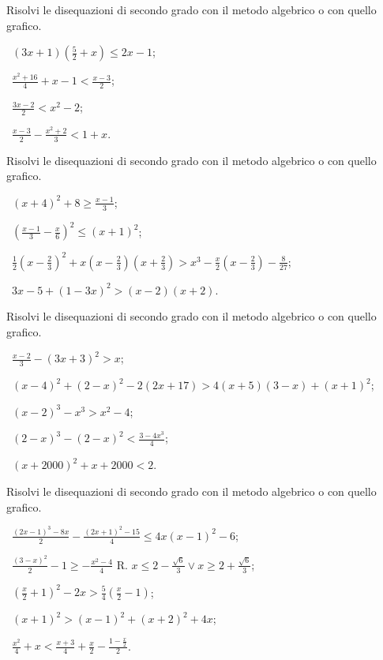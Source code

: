 \begin{esercizio}[\Ast]
 \label{ese:4.19}
Risolvi le disequazioni di secondo grado con il metodo algebrico o con quello grafico.
\begin{multicols}{2}
 \begin{enumeratea}
 \item~$(3x+1)\left(\frac 5 2+x\right)\le 2x-1$;
 \item~$\frac{x^2+16} 4+x-1<\frac{x-3} 2$;
 \item~$\frac{3x-2} 2<x^2-2$;
 \item~$\frac{x-3} 2-\frac{x^2+2} 3<1+x$.
 \end{enumeratea}
 \end{multicols}
\end{esercizio}

\begin{esercizio}[\Ast]
\label{ese:4.20}
Risolvi le disequazioni di secondo grado con il metodo algebrico o con quello grafico.
 \begin{enumeratea}
 \item~$(x+4)^2+8\ge \frac{x-1} 3$;
 \item~$\left(\frac{x-1} 3-\frac x 6\right)^2\le (x+1)^2$;
 \item~$\frac 1 2\left(x-\frac 2 3\right)^2+x\left(x-\frac 2 3\right)\left(x+\frac 2 3\right)>x^3-\frac x 2\left(x-\frac 2 3\right)-\frac 8{27}$;
 \item~$3x-5+(1-3x)^2>(x-2)(x+2)$.
 \end{enumeratea}
\end{esercizio}

\begin{esercizio}[\Ast]
\label{ese:4.21}
Risolvi le disequazioni di secondo grado con il metodo algebrico o con quello grafico.
 \begin{enumeratea}
 \item~$\frac{x-2} 3-(3x+3)^2>x$;
 \item~$(x-4)^2+(2-x)^2-2(2x+17)>4(x+5)(3-x)+(x+1)^2$;
 \item~$(x-2)^3-x^3>x^2-4$;
 \item~$(2-x)^3-(2-x)^2<\frac{3-4x^3} 4$;
 \item~$(x+2000)^2+x+2000<2$.
 \end{enumeratea}
\end{esercizio}

\begin{esercizio}[\Ast]
 \label{ese:4.22}
Risolvi le disequazioni di secondo grado con il metodo algebrico o con quello grafico.
 \begin{enumeratea}
 \item~$\frac{\left(2x-1\right)^3-8x} 2-\frac{\left(2x+1\right)^2-15} 4\le 4x\left(x-1\right)^2-6$;
 \item~$\frac{(3-x)^2} 2-1\ge -\frac{x^2-4} 4$ R. $x\le 2-\frac{\sqrt 6} 3\vee x\ge 2+\frac{\sqrt 6} 3$;
 \item~$\left(\frac x 2+1\right)^2-2x>\frac 5 4\left(\frac x 2-1\right)$;
 \item~$(x+1)^2>(x-1)^2+(x+2)^2+4x$;
 \item~$\frac{x^2} 4+x<\frac{x+3} 4+\frac x 2-\frac{1-\frac x 2} 2$.
 \end{enumeratea}
\end{esercizio}

